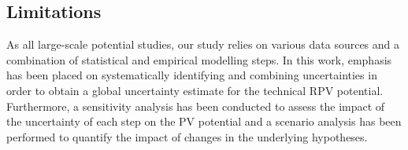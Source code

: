 \subsection{Limitations}
\label{limitations_pv}
As all large-scale potential studies, our study relies on various data sources and a combination of statistical and empirical modelling steps. In this work, emphasis has been placed on systematically identifying and combining uncertainties in order to obtain a global uncertainty estimate for the technical RPV potential. 
Furthermore, a sensitivity analysis has been conducted to assess the impact of the uncertainty of each step on the PV potential and a scenario analysis has been performed to quantify the impact of changes in the underlying hypotheses.

